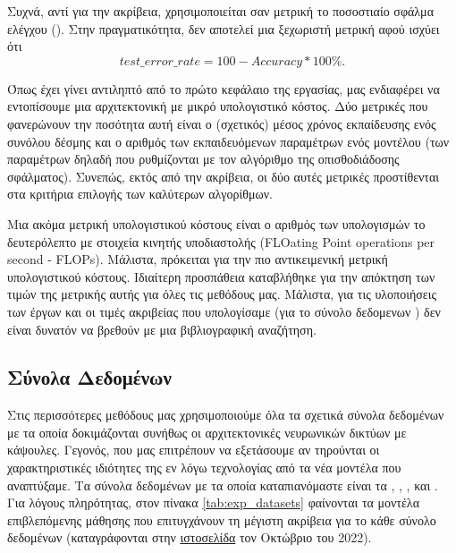 Συχνά, αντί για την ακρίβεια, χρησιμοποιείται σαν μετρική το ποσοστιαίο σφάλμα ελέγχου (). Στην πραγματικότητα, δεν αποτελεί μια ξεχωριστή μετρική αφού ισχύει ότι $$test\_error\_rate = 100 - Accuracy*100\%.$$ \par

Όπως έχει γίνει αντιληπτό από το πρώτο κεφάλαιο της εργασίας, μας ενδιαφέρει να εντοπίσουμε μια αρχιτεκτονική με μικρό υπολογιστικό κόστος. Δύο μετρικές που φανερώνουν την ποσότητα αυτή είναι ο (σχετικός) μέσος χρόνος εκπαίδευσης ενός συνόλου δέσμης και ο αριθμός των εκπαιδευόμενων παραμέτρων ενός μοντέλου (των παραμέτρων δηλαδή που ρυθμίζονται με τον αλγόριθμο της οπισθοδιάδοσης σφάλματος). Συνεπώς, εκτός από την ακρίβεια, οι δύο αυτές μετρικές προστίθενται στα κριτήρια επιλογής των καλύτερων αλγορίθμων.\par
Μια ακόμα μετρική υπολογιστικού κόστους είναι ο αριθμός των υπολογισμών το δευτερόλεπτο με στοιχεία κινητής υποδιαστολής (FLOating Point operations per second - FLOPs). Μάλιστα, πρόκειται για την πιο αντικειμενική μετρική υπολογιστικού κόστους. Ιδιαίτερη προσπάθεια καταβλήθηκε για την απόκτηση των τιμών της μετρικής αυτής για όλες τις μεθόδους μας. Μάλιστα, για τις υλοποιήσεις των έργων \cite{sabour2017dynamic} και \cite{hinton2018matrix} οι τιμές ακριβείας που υπολογίσαμε (για το σύνολο δεδομενων ) δεν είναι δυνατόν να βρεθούν με μια βιβλιογραφική αναζήτηση.

\subsection{Σύνολα Δεδομένων}
Στις περισσότερες μεθόδους μας χρησιμοποιούμε όλα τα σχετικά σύνολα δεδομένων με τα οποία δοκιμάζονται συνήθως οι αρχιτεκτονικές νευρωνικών δικτύων με κάψουλες. Γεγονός, που μας επιτρέπουν να εξετάσουμε αν τηρούνται οι χαρακτηριστικές ιδιότητες της εν λόγω τεχνολογίας από τα νέα μοντέλα που αναπτύξαμε. Τα σύνολα δεδομένων με τα οποία καταπιανόμαστε είναι τα \cite{deng2012mnist}, \cite{Xiao2017FashionMNISTAN}, \cite{CIFAR10}, \cite{sabour2017dynamic} και \cite{lecun2004learning}. Για λόγους πληρότητας, στον πίνακα \ref{tab:exp_datasets} φαίνονται τα μοντέλα επιβλεπόμενης μάθησης που επιτυγχάνουν τη μέγιστη ακρίβεια για το κάθε σύνολο δεδομένων (καταγράφονται στην \href{https://paperswithcode.com/}{ιστοσελίδα} τον Οκτώβριο του 2022).


